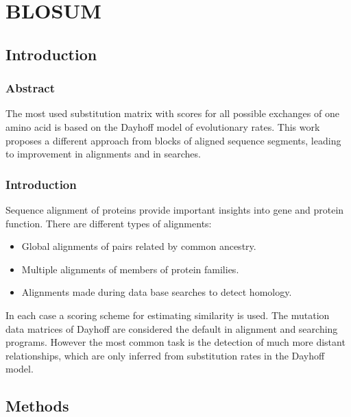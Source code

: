 \graphicspath{{chapters/04/images}}
\chapter{BLOSUM}

\section{Introduction}

	\subsection{Abstract}
	The most used substitution matrix with scores for all possible exchanges of one amino acid is based on the Dayhoff model of evolutionary rates.
	This work proposes a different approach from blocks of aligned sequence segments, leading to improvement in alignments and in searches.

	\subsection{Introduction}
	Sequence alignment of proteins provide important insights into gene and protein function.
	There are different types of alignments:

	\begin{multicols}{2}
		\begin{itemize}
			\item Global alignments of pairs related by common ancestry.
			\item Multiple alignments of members of protein families.
			\item Alignments made during data base searches to detect homology.
		\end{itemize}
	\end{multicols}

	In each case a scoring scheme for estimating similarity is used.
	The mutation data matrices of Dayhoff are considered the default in alignment and searching programs.
	However the most common task is the detection of much more distant relationships, which are only inferred from substitution rates in the Dayhoff model.

\section{Methods}

